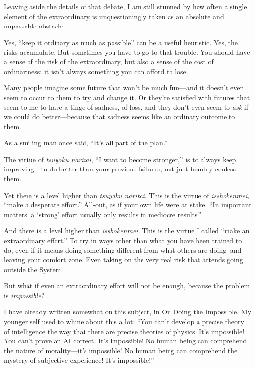 {
 Leaving aside the details of that debate, I am still stunned by
how often a single element of the extraordinary is unquestioningly
taken as an absolute and unpassable obstacle.}

{
 Yes, ``keep it ordinary as much as
possible'' can be a useful heuristic. Yes, the risks
accumulate. But sometimes you have to go to that trouble. You should
have a sense of the risk of the extraordinary, but also a sense of the
cost of ordinariness: it isn't always something you can
afford to lose.}

{
 Many people imagine some future that won't be much
fun---and it doesn't even seem to occur to them to try
and change it. Or they're satisfied with futures that
seem to me to have a tinge of sadness, of loss, and they
don't even seem to \textit{ask} if we could do
better---because that sadness seems like an ordinary outcome to them.}

{
 As a smiling man once said,
``It's all part of the
plan.''}

\myendsectiontext


\bigskip


{
 The virtue of \textit{tsuyoku naritai}, ``I want
to become stronger,'' is to always keep
improving---to do better than your previous failures, not just humbly
confess them. }

{
 Yet there is a level higher than \textit{tsuyoku naritai}. This is
the virtue of \textit{isshokenmei}, ``make a desperate
effort.'' All-out, as if your own life were at stake.
``In important matters, a
`strong' effort usually only results in
mediocre results.''}

{
 And there is a level higher than \textit{isshokenmei}. This is the
virtue I called ``make an extraordinary
effort.'' To try in ways other than what you have
been trained to do, even if it means doing something different from
what others are doing, and leaving your comfort zone. Even taking on
the very real risk that attends going outside the System.}

{
 But what if even an extraordinary effort will not be enough,
because the problem is \textit{impossible}?}

{
 I have already written somewhat on this subject, in On Doing the
Impossible. My younger self used to whine about this a lot:
``You can't develop a precise theory
of intelligence the way that there are precise theories of physics.
It's impossible! You can't prove an AI
correct. It's impossible! No human being can comprehend
the nature of morality---it's impossible! No human
being can comprehend the mystery of subjective experience!
It's impossible!''}

